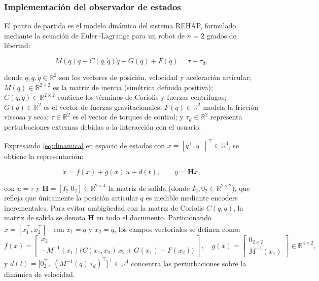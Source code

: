 \documentclass[a4paper,12pt]{article}
\begin{document}
\subsubsection{Implementación del observador de estados}
\label{sec:obs_hgo}

El punto de partida es el modelo dinámico del sistema REHAP, formulado mediante la ecuación de Euler–Lagrange para un robot de $n=2$ grados de libertad:

\begin{equation}
    M(q)\ddot{q} + C(q,\dot{q})\dot{q} + G(q) + F(\dot{q}) = \tau + \tau_d,
    \label{eq:dinamica}
\end{equation}

\noindent donde $q,\dot{q},\ddot{q}\in\mathbb{R}^{2}$ son los vectores de posición, velocidad y aceleración articular; $M(q)\in\mathbb{R}^{2\times 2}$ es la matriz de inercia (simétrica definida positiva); $C(q,\dot{q})\in\mathbb{R}^{2\times 2}$ contiene los términos de Coriolis y fuerzas centrífugas; $G(q)\in\mathbb{R}^{2}$ es el vector de fuerzas gravitacionales; $F(\dot{q})\in\mathbb{R}^{2}$ modela la fricción viscosa y seca; $\tau\in\mathbb{R}^{2}$ es el vector de torques de control; y $\tau_d\in\mathbb{R}^{2}$ representa perturbaciones externas debidas a la interacción con el usuario.

Expresando \eqref{eq:dinamica} en espacio de estados con $x=[q^{\top},\dot{q}^{\top}]^{\top}\in\mathbb{R}^{4}$, se obtiene la representación:

\begin{equation}
    \dot{x} = f(x) + g(x)\,u + d(t), \qquad y = \mathbf{H}x,
    \label{eq:estadoesp}
\end{equation}

\noindent con $u=\tau$ y $\mathbf{H}=[I_{2}\;0_{2}]\in\mathbb{R}^{2\times 4}$ la matriz de salida (donde $I_{2},0_{2}\in\mathbb{R}^{2\times 2}$), que refleja que únicamente la posición articular $q$ es medible mediante encoders incrementales. Para evitar ambigüedad con la matriz de Coriolis $C(q,\dot{q})$, la matriz de salida se denota $\mathbf{H}$ en todo el documento. Particionando $x=[x_1^{\top},x_2^{\top}]^{\top}$ con $x_1=q$ y $x_2=\dot{q}$, los campos vectoriales se definen como:
\begin{equation}
    f(x) = \begin{bmatrix} x_2 \\ -M^{-1}(x_1)\bigl(C(x_1,x_2)\,x_2 + G(x_1) + F(x_2)\bigr) \end{bmatrix},\quad
    g(x) = \begin{bmatrix} 0_{2\times 2} \\ M^{-1}(x_1) \end{bmatrix}\in\mathbb{R}^{4\times 2},
    \label{eq:fg}
\end{equation}
y $d(t)=\bigl[0_{2}^{\top},\;(M^{-1}(q)\,\tau_d)^{\top}\bigr]^{\top}\in\mathbb{R}^{4}$ concentra las perturbaciones sobre la dinámica de velocidad.
\end{document}
